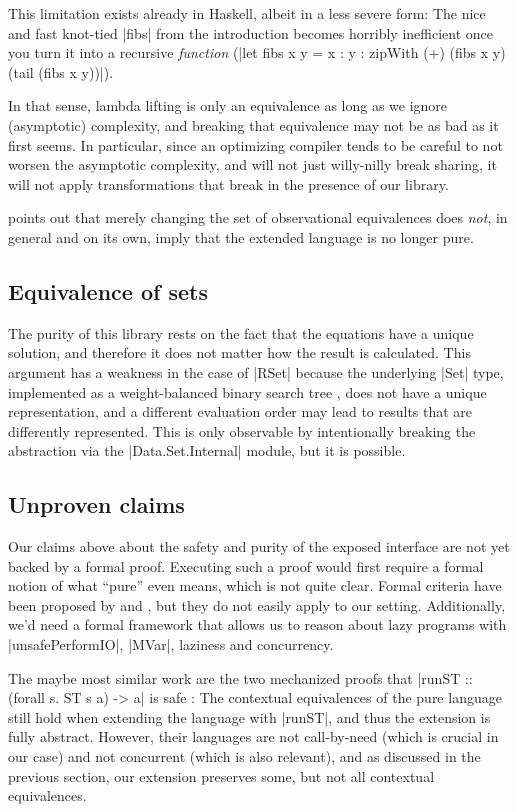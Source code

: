 \documentclass[manuscript,screen,acmsmall,nonacm]{acmart}
\begin{document}
This limitation exists already in Haskell, albeit in a less severe form: The nice and fast knot-tied |fibs| from the introduction becomes horribly inefficient once you turn it into a recursive \emph{function} (|let fibs x y = x : y  : zipWith (+) (fibs x y) (tail (fibs x y))|).

In that sense, lambda lifting is only an equivalence as long as we ignore (asymptotic) complexity, and breaking that equivalence may not be as bad as it first seems.
In particular, since an optimizing compiler tends to be careful to not worsen the asymptotic complexity, and will not just willy-nilly break sharing, it will not apply transformations that break in the presence of our library.

 points out that merely changing the set of observational equivalences does \emph{not}, in general and on its own, imply that the extended language is no longer pure.

\subsection{Equivalence of sets}

The purity of this library rests on the fact that the equations have a unique solution, and therefore it does not matter how the result is calculated. This argument has a weakness in the case of |RSet| because the underlying |Set| type, implemented as a weight-balanced binary search tree \citep{adams-tr,nievergelt}, does not have a unique representation, and a different evaluation order may lead to results that are differently represented. This is only observable by intentionally breaking the abstraction via the |Data.Set.Internal| module, but it is possible.

\subsection{Unproven claims}

Our claims above about the safety and purity of the exposed interface are not yet backed by a formal proof. Executing such a proof would first require a formal notion of what “pure” even means, which is not quite clear. Formal criteria have been proposed by \citet{sabry} and \citet{longley}, but they do not easily apply to our setting. Additionally, we’d need a formal framework that allows us to reason about lazy programs with |unsafePerformIO|, |MVar|, laziness and concurrency.

The maybe most similar work are the two mechanized proofs that |runST :: (forall s. ST s a) -> a| is safe \citep{runST,runST2}: The contextual equivalences of the pure language still hold when extending the language with |runST|, and thus the extension is fully abstract.  However, their languages are not call-by-need (which is crucial in our case) and not concurrent (which is also relevant), and as discussed in the previous section, our extension preserves some, but not all contextual equivalences.
\end{document}
